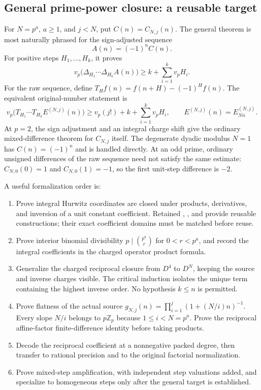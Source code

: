 \subsection{General prime-power closure: a reusable target}
For $N=p^a$, $a\ge1$, and $j<N$, put $C(n)=C_{N,j}(n)$. The general theorem is most naturally phrased for the sign-adjusted sequence
\[
 A(n)=(-1)^n C(n).
\]
For positive steps $H_1,\ldots,H_k$, it proves
\[
 v_p\bigl(\Delta_{H_1}\cdots\Delta_{H_k}A(n)\bigr)
 \ge k+\sum_{i=1}^k v_pH_i.
\]
For the raw sequence, define $T_H f(n)=f(n+H)-(-1)^Hf(n)$. The equivalent original-number statement is
\[
 v_p\bigl(T_{H_1}\cdots T_{H_k}E^{(N,j)}(n)\bigr)
 \ge v_p(j!)+k+\sum_{i=1}^k v_pH_i,
 \qquad E^{(N,j)}(n)=E_{Nn}^{(N,j)}.
\]
At $p=2$, the sign adjustment and an integral charge shift give the ordinary mixed-difference theorem for $C_{N,j}$ itself. The degenerate dyadic modulus $N=1$ has $C(n)=(-1)^n$ and is handled directly. At an odd prime, ordinary unsigned differences of the raw sequence need not satisfy the same estimate: $C_{N,0}(0)=1$ and $C_{N,0}(1)=-1$, so the first unit-step difference is $-2$.

A useful formalization order is:
\begin{enumerate}
\item Prove integral Hurwitz coordinates are closed under products, derivatives, and inversion of a unit constant coefficient. Retained , , and  provide reusable constructions; their exact coefficient domains must be matched before reuse.
\item Prove interior binomial divisibility $p\mid\binom{p^a}{r}$ for $0<r<p^a$, and record the integral coefficients in the charged operator product formula.
\item Generalize the charged reciprocal closure from $D^4$ to $D^N$, keeping the source and inverse charges visible. The critical induction isolates the unique term containing the highest inverse order. No hypothesis $k\le n$ is permitted.
\item Prove flatness of the actual source $g_{N,j}(n)=\prod_{i=1}^j(1+(N/i)n)^{-1}$. Every slope $N/i$ belongs to $p\mathbb Z_p$ because $1\le i<N=p^a$. Prove the reciprocal affine-factor finite-difference identity before taking products.
\item Decode the reciprocal coefficient at a nonnegative packed degree, then transfer to rational precision and to the original factorial normalization.
\item Prove mixed-step amplification, with independent step valuations added, and specialize to homogeneous steps only after the general target is established.
\end{enumerate}

